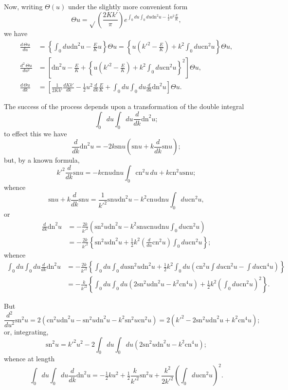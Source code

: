 \documentclass[11pt,a4paper]{book}
\providecommand{\sn}{\mathrm{sn}}
\providecommand{\cn}{\mathrm{cn}}
\providecommand{\dn}{\mathrm{dn}}
\begin{document}
Now, writing $\Theta(u)$ under the slightly more convenient form
\[
\Theta u = \sqrt{}\left(\frac{2Kk'}{\pi}\right) e^{\int_0 du \int_0 du \dn^2 u - \frac{1}{2}u^2 \frac{E}{K}},
\]
we have
\begin{align*}
\frac{d\, \Theta u}{du} &= \left\{\int_0 du \dn^2 u - \frac{E}{K}u\right\} \Theta u = \left\{u\left(k'^2 - \frac{E}{K}\right) + k^2 \int_0 du \cn^2 u\right\} \Theta u, \\
\frac{d^2\, \Theta u}{du^2} &= \left[\dn^2 u - \frac{E}{K} + \left\{u\left(k'^2 - \frac{E}{K}\right) + k^2 \int_0 du \cn^2 u\right\}^2\right] \Theta u, \\
\frac{d\, \Theta u}{dk} &= \left[\frac{1}{2Kk'}\frac{dKk'}{dk} - \tfrac{1}{2}u^2 \frac{d}{dk}\frac{E}{K} + \int_0 du \int_0 du \frac{d}{dk} \dn^2 u\right] \Theta u.
\end{align*}


The success of the process depends upon a transformation of the double integral
\[
\int_0 du \int_0 du \frac{d}{dk} \dn^2 u;
\]
to effect this we have
\[
\frac{d}{dk} \dn^2 u = -2k \sn u \left(\sn u + k \frac{d}{dk} \sn u\right);
\]
but, by a known formula,
\[
k'^2 \frac{d}{dk} \sn u = -k \cn u \dn u \int_0 \cn^2 u \, du + k \cn^2 u \sn u;
\]
whence
\[
\sn u + k \frac{d}{dk} \sn u = \frac{1}{k'^2} \sn u \dn^2 u - k^2 \cn u \dn u \int_0 du \cn^2 u,
\]
or
\begin{align*}
\frac{d}{dk} \dn^2 u &= -\frac{2k}{k'^2} (\sn^2 u \dn^2 u - k^2 \sn u \cn u \dn u \int_0 du \cn^2 u) \\
&= -\frac{2k}{k'^2} \left\{\sn^2 u \dn^2 u + \tfrac{1}{2}k^2 \left(\frac{d}{du} \cn^2 u\right) \int_0 du \cn^2 u\right\};
\end{align*}
whence
{\small
\begin{align*}
\int_0 du \int_0 du \frac{d}{dk} \dn^2 u &= -\frac{2k}{k'^2} \left\{\int_0 du \int_0 du \sn^2 u \dn^2 u + \tfrac{1}{2}k^2 \int_0 du (\cn^2 u \int du \cn^2 u - \int du \cn^4 u)\right\} \\
&= -\frac{k}{k'^2} \left\{\int_0 du \int_0 du (2 \sn^2 u \dn^2 u - k^2 \cn^4 u) + \tfrac{1}{2}k^2 (\int_0 du \cn^2 u)^2\right\}.
\end{align*}
}

But
\[
\frac{d^2}{du^2} \sn^2 u = 2(\cn^2 u \dn^2 u - \sn^2 u \dn^2 u - k^2 \sn^2 u \cn^2 u) = 2(k'^2 - 2 \sn^2 u \dn^2 u + k^2 \cn^4 u);
\]
or, integrating,
\[
\sn^2 u = k'^2 u^2 - 2 \int_0 du \int_0 du (2 \sn^2 u \dn^2 u - k^2 \cn^4 u);
\]
whence at length
\[
\int_0 du \int_0 du \frac{d}{dk} \dn^2 u = -\tfrac{1}{2} k u^2 + \tfrac{1}{2} \frac{k}{k'^2} \sn^2 u + \frac{k^2}{2k'^2} (\int_0 du \cn^2 u)^2.
\]
\end{document}
